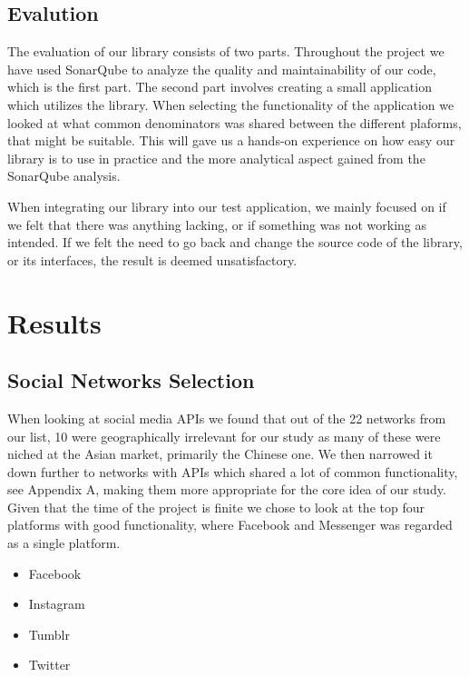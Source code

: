 \documentclass{sigchi-alternate}
\begin{document}
\subsection{Evalution}
The evaluation of our library consists of two parts. Throughout the project we have used SonarQube to analyze the quality and maintainability of our code, which is the first part. The second part
involves creating a small application which utilizes the library. When selecting the functionality of the application we looked at what common denominators was shared between the different plaforms, that might be suitable. This will gave us a hands-on experience on how easy our library is to use in practice and the more analytical aspect gained
from the SonarQube analysis. 

When integrating our library into our test application, we mainly focused on if we felt that there was anything lacking, or if something was not working as intended. If we felt the need to go back and
change the source code of the library, or its interfaces, the result is deemed unsatisfactory. 

\section{Results}
\subsection{Social Networks Selection}
When looking at social media APIs we found that out of the 22 networks from our list\autocite{STATISTA_LEADING_SOCIAL_NETWORKS}, 10 were geographically irrelevant for our study as many of these were
niched at the Asian market, primarily the Chinese one. We then narrowed it down further to networks with APIs which shared a lot of common functionality, see Appendix A, making them more appropriate for the core idea
of our study. Given that the time of the project is finite we chose to look at the top four platforms with good functionality, where Facebook and Messenger was regarded as a single platform.
\begin{itemize}
	\item Facebook
	\item Instagram
	\item Tumblr
	\item Twitter
\end{itemize}
\end{document}
